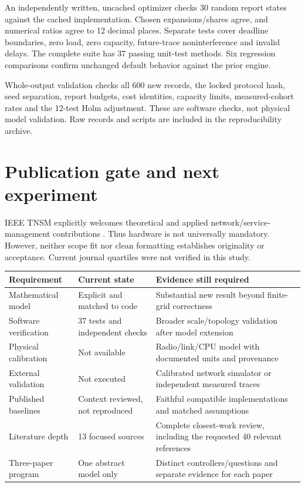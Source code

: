 \documentclass[10pt,a4paper]{article}
\newcommand{\page}[1]{\clearpage\section{#1}}
\begin{document}
An independently written, uncached optimizer checks 30 random report states
against the cached implementation. Chosen expansions/shares agree, and numerical
ratios agree to 12 decimal places. Separate tests cover deadline boundaries,
zero load, zero capacity, future-trace noninterference and invalid delays.
The complete suite has 37 passing unit-test methods. Six regression comparisons
confirm unchanged default behavior against the prior engine.

Whole-output validation checks all 600 new records, the locked protocol hash,
seed separation, report budgets, cost identities, capacity limits, measured-cohort
rates and the 12-test Holm adjustment. These are software checks, not physical
model validation. Raw records and scripts are included in the reproducibility archive.

\page{Publication gate and next experiment}
IEEE TNSM explicitly welcomes theoretical and applied network/service-management
contributions \cite{tnsm}. Thus hardware is not universally mandatory. However,
neither scope fit nor clean formatting establishes originality or acceptance.
Current journal quartiles were not verified in this study.

\begin{center}\small
\begin{tabular}{p{36mm}p{48mm}p{65mm}}\toprule
Requirement & Current state & Evidence still required\\\midrule
Mathematical model & Explicit and matched to code & Substantial new result beyond finite-grid correctness\\
Software verification & 37 tests and independent checks & Broader scale/topology validation after model extension\\
Physical calibration & Not available & Radio/link/CPU model with documented units and provenance\\
External validation & Not executed & Calibrated network simulator or independent measured traces\\
Published baselines & Context reviewed, not reproduced & Faithful compatible implementations and matched assumptions\\
Literature depth & 13 focused sources & Complete closest-work review, including the requested 40 relevant references\\
Three-paper program & One abstract model only & Distinct controllers/questions and separate evidence for each paper\\\bottomrule
\end{tabular}\end{center}
\end{document}
